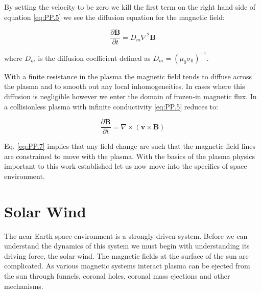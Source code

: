\documentclass[utf8]{report}
\newcommand{\Alfven}[1][0]{Alfv\'{e}n }
\begin{document}
By setting the velocity to be zero we kill the first term on the right hand side of equation \ref{eq:PP.5} we see the diffusion equation for the magnetic field: 

\begin{equation}
    \frac{\partial \textbf{B}}{\partial t} = D_{m}\nabla^{2}\textbf{B}
    \label{eq:PP.6}
\end{equation}

where $D_{m}$ is the diffusion coefficient defined as $D_{m} = (\mu_{0}\sigma_{0})^{-1}$.

With a finite resistance in the plasma the magnetic field tends to diffuse across the plasma and to smooth out any local inhomogeneities. In cases where this diffusion is negligible however we enter the domain of frozen-in magnetic flux. In a collisionless plasma with infinite conductivity \ref{eq:PP.5} reduces to: 

\begin{equation}
    \frac{\partial \textbf{B}}{\partial t} = \nabla \times (\textbf{v}\times\textbf{B})
    \label{eq:PP.7}
\end{equation}

Eq. \ref{eq:PP.7} implies that any field change are such that the magnetic field lines are constrained to move with the plasma. With the basics of the plasma physics important to this work established let us now move into the specifics of space environment. 

\section{Solar Wind}


The near Earth space environment is a strongly driven system. Before we can understand the dynamics of this system we must begin with understanding its driving force, the solar wind. The magnetic fields at the surface of the sun are complicated. As various magnetic systems interact plasma can be ejected from the sun through funnels, coronal holes, coronal mass ejections and other mechanisms. %
\end{document}
